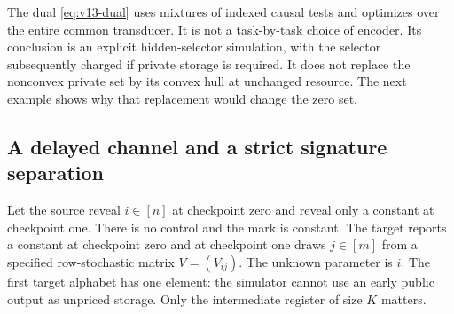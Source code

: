 \begin{remark}\label{rem:v13-converse}
The dual \eqref{eq:v13-dual} uses mixtures of indexed causal tests and
optimizes over the entire common transducer. It is not a task-by-task
choice of encoder. Its conclusion is an explicit hidden-selector
simulation, with the selector subsequently charged if private storage
is required. It does not replace the nonconvex private set by its
convex hull at unchanged resource. The next example shows why that
replacement would change the zero set.
\end{remark}

\subsection{A delayed channel and a strict signature separation}
Let the source reveal $i\in[n]$ at checkpoint zero and reveal only a
constant at checkpoint one. There is no control and the mark is
constant. The target reports a constant at checkpoint zero and at
checkpoint one draws $j\in[m]$ from a specified row-stochastic matrix
$V=(V_{ij})$. The unknown parameter is $i$. The first target alphabet
has one element: the simulator cannot use an early public output as
unpriced storage. Only the intermediate register of size $K$ matters.

